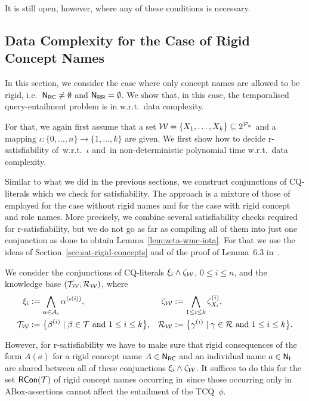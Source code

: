 \noindent
It is still open, however, where any of these conditions is necessary.


\subsection{Data Complexity for the Case of Rigid Concept Names}\label{sec:tcq-data-complexity-rigid-concepts}

In this section, we consider the case where only concept names are allowed to be
rigid, i.e.~$\mathsf{N_{RC}}\ne\emptyset$ and $\mathsf{N_{RR}}=\emptyset$.  We show that, in this
case, the temporalised query-entailment problem is in \coNP w.r.t.\ data
complexity.

For that, we again first assume that a set
$\mathcal{W}=\{X_1,\dots,X_k\}\subseteq 2^{\mathcal{P}_\phi}$ and a mapping
$\iota\colon\{0,\dots,n\}\to\{1,\dots,k\}$ are given.
%
We first show how to decide r-satisfiability of~\Wmc w.r.t.~$\iota$ and~\Kmc in
non-deterministic polynomial time w.r.t.\ data complexity.

Similar to what we did in the previous sections, we construct conjunctions of
CQ-literals which we check for satisfiability.  The approach is a mixture of
those of employed for the case without rigid names and for the case with rigid
concept and role names.  More precisely, we combine several satisfiability
checks required for r-satisfiability, but we do not go as far as compiling all
of them into just one conjunction as done to obtain
Lemma~\ref{lem:zeta-wmc-iota}.  For that we use the ideas of
Section~\ref{sec:sat-rigid-concepts} and of the proof of Lemma~6.3
in~\cite{BaGL-ToCL12}.

We consider the conjunctions of CQ-literals $\xi_i\land\zeta_\mathcal{W}$,
$0\le i\le n$, and the knowledge base $(\mathcal{T}_\mathcal{W},\mathcal{R}_\mathcal{W})$, where
\begin{align*}
    \xi_i
    &:=\bigwedge_{\alpha\in\mathcal{A}_i}\alpha^{(\iota(i))},
    &\zeta_\mathcal{W}
    &:=\bigwedge_{1\le i\le k}\zeta_{X_i}^{(i)},\\
    \mathcal{T}_\mathcal{W}
    &:=\bigl\{\beta^{(i)}\mid\beta\in\mathcal{T}\ \text{and}\ 1\le i\le k\bigr\},
    &\mathcal{R}_\mathcal{W}
    &:=\bigl\{\gamma^{(i)}\mid\gamma\in\mathcal{R}\ \text{and}\ 1\le i\le k\bigr\}.
\end{align*}

However, for r-satisfiability we have to make sure that rigid consequences of
the form $A(a)$ for a rigid concept name $A\in\mathsf{N_{RC}}$ and an individual name
$a\in\mathsf{N_I}$ are shared between all of these conjunctions $\xi_i\land\zeta_\mathcal{W}$.
%
It suffices to do this for the set $\operatorname{\mathsf{RCon}}(\mathcal{T})$ of rigid concept names
occurring in~\Tmc since those occurring only in ABox-assertions cannot affect
the entailment of the TCQ~$\phi$.

